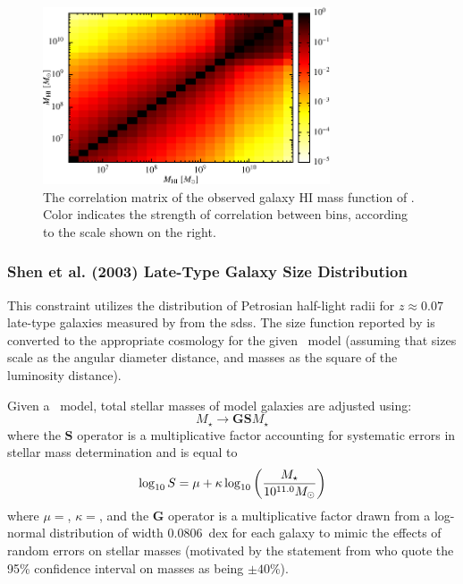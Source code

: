 \begin{figure}
 \includegraphics[width=85mm,trim=0mm 0mm 0mm 0mm,clip]{Plots/DataAnalysis/alfalfaHICorrelationmatrix.pdf}
 \caption{The correlation matrix of the observed galaxy HI mass function of \protect\cite{martin_arecibo_2010}. Color indicates the strength of correlation between bins, according to the scale shown on the right.}
 \label{fig:CorrelationMatrixALFALFA}
\end{figure}

\subsubsection{Shen et al. (2003) Late-Type Galaxy Size Distribution}\label{sec:SDSSLateTypeGalaxySizeDistribution}

This constraint utilizes the distribution of Petrosian half-light radii for $z\approx 0.07$ late-type galaxies measured by \cite{shen_size_2003} from the \gls{sdss}. The size function reported by \cite{shen_size_2003} is converted to the appropriate cosmology for the given \glc\ model (assuming that sizes scale as the angular diameter distance, and masses as the square of the luminosity distance).

Given a \glc\ model, total stellar masses of model galaxies are adjusted using:
\begin{equation}
 M_\star \rightarrow {\mathbf G} {\mathbf S} M_\star 
\end{equation}
where the ${\mathbf S}$ operator is a multiplicative factor accounting for systematic errors in stellar mass determination and is equal to \citep{behroozi_comprehensive_2010}
\begin{equation}
 \log_{\mathrm 10} S = \mu + \kappa \log_{\mathrm 10} \left({M_\star \over 10^{11.0}M_\odot}\right)
\end{equation}
where $\mu=${\normalfont {}}, $\kappa=${\normalfont {}}, and the {\normalfont \bfseries G} operator is a multiplicative factor drawn from a log-normal distribution of width $0.0806$~dex for each galaxy to mimic the effects of random errors on stellar masses (motivated by the statement from \cite{shen_size_2003} who quote the 95\% confidence
interval on masses as being $\pm 40$\%).

